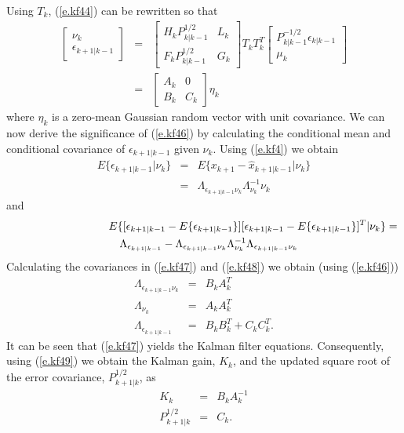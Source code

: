 	Using $T_k$, (\ref{e.kf44}) can be rewritten so that
%
\begin{eqnarray}
\left[\begin{array}{c}\nu_k\\\epsilon_{k+1|k-1}\end{array}\right]
&=&
  \left[\begin{array}{cc}H_kP_{k|k-1}^{1/2}&L_k\\
                         F_kP_{k|k-1}^{1/2}&G_k\end{array}\right]T_kT_k^T
\left[\begin{array}{c}P_{k|k-1}^{-1/2}\epsilon_{k|k-1}\\\mu_k\end{array}\right]
\nonumber\\
&=&
  \left[\begin{array}{cc}A_k&0\\
                         B_k&C_k\end{array}\right]\eta_k
\label{e.kf46}
\end{eqnarray}
%
where $\eta_k$ is a zero-mean Gaussian random vector with unit
covariance.  We can now derive the
significance of (\ref{e.kf46}) by calculating the
conditional mean and conditional covariance of $\epsilon_{k+1|k-1}$
given $\nu_k$.  Using (\ref{e.kf4}) we obtain
%
\begin{eqnarray}
E\{\epsilon_{k+1|k-1}|\nu_k\}&=&E\{x_{k+1}-\hat{x}_{k+1|k-1}|\nu_k\}\nonumber\\
&=&\Lambda_{\epsilon_{k+1|k-1}\nu_k}\Lambda_{\nu_k}^{-1}\nu_k
\label{e.kf47}
\end{eqnarray}
%
and
%
\begin{eqnarray}
\lefteqn{E\{[\epsilon_{k+1|k-1}-E\{\epsilon_{k+1|k-1}\}][\epsilon_{k+1|k-1}-E\{\epsilon_{k+1|k-1}\}]^T|\nu_k\}=}\nonumber\\
&&\Lambda_{\epsilon_{k+1|k-1}}-\Lambda_{\epsilon_{k+1|k-1}\nu_k}\Lambda_{\nu_k}^{-1}\Lambda_{\epsilon_{k+1|k-1}\nu_k}
\label{e.kf48}
\end{eqnarray}
%
Calculating the covariances in (\ref{e.kf47}) and (\ref{e.kf48}) we
obtain (using (\ref{e.kf46}))
%
\begin{eqnarray}
\Lambda_{\epsilon_{k+1|k-1}\nu_k}&=&B_kA_k^T\nonumber\\
\Lambda_{\nu_k}&=&A_kA_k^T\nonumber\\
\Lambda_{\epsilon_{k+1|k-1}}&=&B_kB_k^T+C_kC_k^T.
\label{e.kf49}
\end{eqnarray}
%
It can be seen that (\ref{e.kf47}) yields the Kalman filter equations.
Consequently, using (\ref{e.kf49}) we obtain the Kalman
gain, $K_k$, and the updated square root of the error covariance,
$P_{k+1|k}^{1/2}$, as
%
\begin{eqnarray}
K_k&=&B_kA_k^{-1}\nonumber\\
P_{k+1|k}^{1/2}&=&C_k.
\label{e.kf50}
\end{eqnarray}
%

